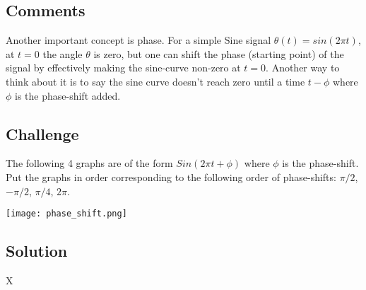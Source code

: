 \subsection*{Comments}
Another important concept is phase. For a simple Sine signal $\theta(t) = sin(2 \pi t)$, at $t=0$ the angle $\theta$ is zero, but one can shift the phase (starting point) of the signal by effectively making the sine-curve non-zero at $t=0$. Another way to think about it is to say the sine curve doesn't reach zero until a time $t-\phi$ where $\phi$ is the phase-shift added.

\subsection*{Challenge}

The following 4 graphs are of the form $Sin(2 \pi t + \phi)$ where $\phi$ is the phase-shift. Put the graphs in order corresponding to the following order of phase-shifts: $\pi/2$, $-\pi/2$, $\pi/4$, $2 \pi$.

\texttt{[image: phase\_shift.png]}

\subsection*{Solution}
X

